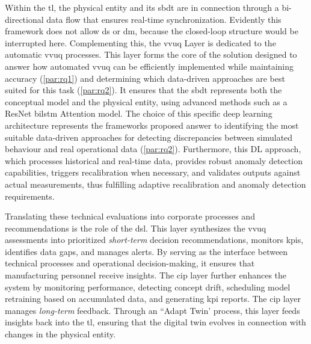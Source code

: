 Within the \gls{tl}, the physical entity and its \gls{sbdt} are in connection through a bi-directional data flow that ensures real-time synchronization. Evidently this framework does not allow \gls{ds} or \gls{dm}, because the closed-loop structure would be interrupted here. Complementing this, the \gls{vvuq} Layer is dedicated to the automatic \gls{vvuq} processes. This layer forms the core of the solution designed to answer how automated \gls{vvuq} can be efficiently implemented while maintaining accuracy (\autoref{par:rq1}) and determining which data-driven approaches are best suited for this task (\autoref{par:rq2}). It ensures that the \gls{sbdt} represents both the conceptual model and the physical entity, using advanced methods such as a ResNet \gls{bilstm} Attention model. The choice of this specific deep learning architecture represents the frameworks proposed answer to identifying the most suitable data-driven approaches for detecting discrepancies between simulated behaviour and real operational data (\autoref{par:rq2}). Furthermore, this DL approach, which processes historical and real-time data, provides robust anomaly detection capabilities, triggers recalibration when necessary, and validates outputs against actual measurements, thus fulfilling adaptive recalibration and anomaly detection requirements.

Translating these technical evaluations into corporate processes and recommendations is the role of the \gls{dsl}. This layer synthesizes the \gls{vvuq} assessments into prioritized \textit{short-term} decision recommendations, monitors \gls{kpi}s, identifies data gaps, and manages alerts. By serving as the interface between technical processes and operational decision-making, it ensures that manufacturing personnel receive insights. The \gls{cip} layer further enhances the system by monitoring performance, detecting concept drift, scheduling model retraining based on accumulated data, and generating \gls{kpi} reports. The \gls{cip} layer manages \textit{long-term} feedback. Through an ``Adapt Twin' process, this layer feeds insights back into the \gls{tl}, ensuring that the digital twin evolves in connection with changes in the physical entity.

